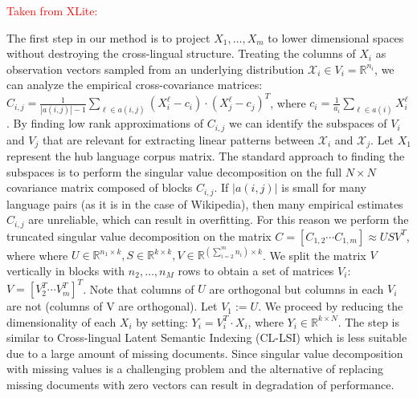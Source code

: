 \documentclass[twoside,11pt]{article}
\newcommand{\oldText}[1]{\textcolor{red}{#1:}\color{blue}}
\newcommand{\RR}{\mathbb{R}}
\begin{document}
{\oldText{Taken from XLite}

The first step in our method is to project $X_1, \ldots, X_m$ to lower dimensional spaces without destroying the cross-lingual structure. Treating the columns of $X_i$ as observation vectors sampled from an underlying distribution $\mathcal{X}_i \in V_i = \RR^{n_i}$, we can analyze the empirical cross-covariance matrices: $C_{i,j} = \frac{1}{|a(i,j)|-1 }\sum_{\ell \in a(i,j)} (X_i^{\ell} - c_i)\cdot (X_j^{\ell} - c_j)^T$, where $c_i = \frac{1}{a_i} \sum_{\ell \in a(i)}X_i^{\ell}$. By finding low rank approximations of $C_{i,j}$ we can identify the subspaces of $V_i$ and $V_j$ that are relevant for extracting linear patterns between $\mathcal{X}_i$ and $\mathcal{X}_j$. Let $X_1$ represent the hub language corpus matrix. The standard approach to finding the subspaces is to perform the singular value decomposition on the full $N \times N$ covariance matrix composed of blocks $C_{i,j}$. If $|a(i,j)|$ is small for many language pairs (as it is in the case of Wikipedia), then many empirical estimates $C_{i,j}$ are unreliable, which can result in overfitting. For this reason we perform the truncated singular value decomposition on the matrix $C = [C_{1,2}  \cdots  C_{1,m}] \approx U S V^T$, where where $U \in \RR^{n_1 \times k}, S \in \RR^{k \times k}, V \in \RR^{(\sum_{i=2}^m n_i) \times k}$. We split the matrix $V$ vertically in blocks with $n_2, \ldots, n_M$ rows to obtain a set of matrices $V_i$: $V = [V_2^T  \cdots  V_m^T]^T$. Note that columns of $U$ are orthogonal but columns in each $V_i$ are not (columns of V are orthogonal). Let $V_1 := U$. We proceed by reducing the dimensionality of each $X_i$ by setting: $Y_i = V_i^T \cdot X_i$, where $Y_i \in \RR^{k\times N}$. The step is similar to Cross-lingual Latent Semantic Indexing (CL-LSI) \cite{lsi}\cite{cl_lsi} which is less suitable due to a large amount of missing documents. Since singular value decomposition with missing values is a challenging problem and the alternative of replacing missing documents with zero vectors can result in degradation of performance.

}
\end{document}
